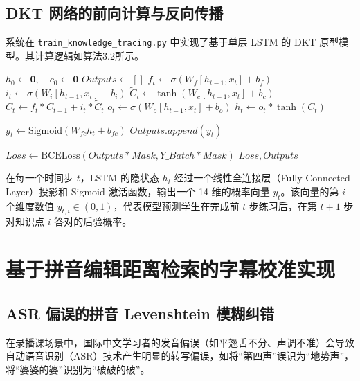 \subsection{DKT 网络的前向计算与反向传播}
系统在 \texttt{train\_knowledge\_tracing.py} 中实现了基于单层 LSTM 的 DKT 原型模型。其计算逻辑如算法3.2所示。

\begin{algorithm}
\caption{基于 PyTorch LSTM 的深度知识追踪算法}
\label{ag:3.2}
\begin{algorithmic}[1]
    \State $h_0 \gets \mathbf{0}, \quad c_0 \gets \mathbf{0}$ 
    \State $Outputs \gets []$
        \State $f_t \gets \sigma(W_f [h_{t-1}, x_t] + b_f)$ 
        \State $i_t \gets \sigma(W_i [h_{t-1}, x_t] + b_i)$ 
        \State $\tilde{C}_t \gets \tanh(W_c [h_{t-1}, x_t] + b_c)$
        \State $C_t \gets f_t * C_{t-1} + i_t * \tilde{C}_t$ 
        \State $o_t \gets \sigma(W_o [h_{t-1}, x_t] + b_o)$ 
        \State $h_t \gets o_t * \tanh(C_t)$
        
        \State $y_t \gets \text{Sigmoid}(W_{fc} h_t + b_{fc})$ 
        \State $Outputs.append(y_t)$
    \EndFor
    
    \State $Loss \gets \text{BCELoss}(Outputs * Mask, Y\_Batch * Mask)$ 
    \State {}
    \State \Return $Loss, Outputs$
\EndProcedure
\end{algorithmic}
\end{algorithm}

在每一个时间步 $t$，LSTM 的隐状态 $h_t$ 经过一个线性全连接层（Fully-Connected Layer）投影和 Sigmoid 激活函数，输出一个 14 维的概率向量 $y_t$。该向量的第 $i$ 个维度数值 $y_{t,i} \in (0, 1)$，代表模型预测学生在完成前 $t$ 步练习后，在第 $t+1$ 步对知识点 $i$ 答对的后验概率。

\section{基于拼音编辑距离检索的字幕校准实现}

\subsection{ASR 偏误的拼音 Levenshtein 模糊纠错}
在录播课场景中，国际中文学习者的发音偏误（如平翘舌不分、声调不准）会导致自动语音识别（ASR）技术产生明显的转写偏误，如将“第四声”误识为“地势声”，将“婆婆的婆”识别为“破破的破”。

